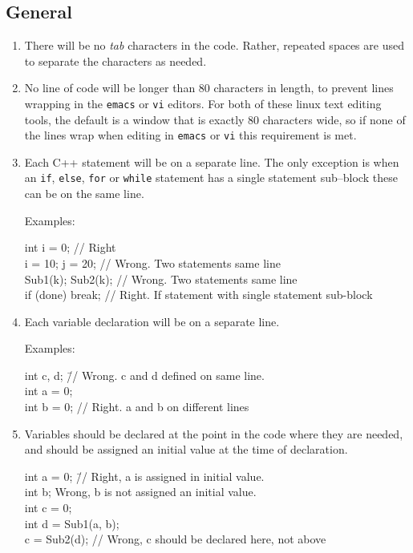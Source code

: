 \documentclass[11pt]{article}
\begin{document}
\subsection{General}
\begin{enumerate}
\item There will be no {\em tab} characters in the code.  Rather, repeated
spaces are used to separate the characters as needed.
\item No line of code will be longer than 80 characters in length, to
prevent lines wrapping in the {\tt emacs} or {\tt vi} editors.  For both
of these linux text editing tools, the default is a window that is
exactly 80 characters wide, so if none of the lines wrap when editing
in {\tt emacs} or {\tt vi} this requirement is met.

\item Each C++ statement will be on a separate line.  The only exception
is when an {\tt if}, {\tt else}, {\tt for} or {\tt while}
statement has a single
statement sub--block these can be on the same line.

Examples:

\begin{tt}
int i = 0; // Right\\
i = 10; j = 20;   // Wrong. Two statements same line\\
Sub1(k); Sub2(k); // Wrong. Two statements same line\\
if (done) break;  // Right. If statement with single statement sub-block
\end{tt}

\item Each variable declaration will be on a separate line.

Examples:

\begin{tt}
\begin{tabbing}
int c, d; \=// Wrong.  c and d defined on same line.\\
int a = 0;    \\
int b = 0;    \>// Right.  a and b on different lines\\
\end{tabbing}
\end{tt}

\item Variables should be declared at the point in the code
where they are needed, and should be assigned an initial value
at the time of declaration.

\begin{tt}
\begin{tabbing}
int a = 0;          \=// Right, a is assigned in initial value.\\
int b; \> Wrong, b is not assigned an initial value.\\
int c = 0; \\
int d = Sub1(a, b);\\
c = Sub2(d); \> // Wrong, c should be declared here, not above
\end{tabbing}
\end{tt}


\end{enumerate}
\end{document}
